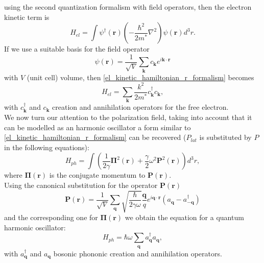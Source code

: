 \documentclass[12pt, a4paper]{report}
\numberwithin{equation}{section}
\begin{document}
using the second quantization formalism with field operators, then the electron kinetic term is
\begin{equation}
    H_{el}=\int\psi^\dagger(\mathbf{r})\left(-\frac{\hbar^2}{2m^*}\nabla^2\right)\psi(\mathbf{r})d^3r.
    \label{el_kinetic_hamiltonian_r_formalism}
\end{equation}
If we use a suitable basis for the field operator
\begin{equation}
    \psi(\mathbf{r})=\frac{1}{\sqrt{V}}\sum_\mathbf{k}c_\mathbf{k}e^{i\mathbf{k}\cdot\mathbf{r}}
    \label{from_r_to_k_electron_field_operator}
\end{equation}
with $V$ (unit cell) volume, then \ref{el_kinetic_hamiltonian_r_formalism} becomes
\begin{equation}
    H_{el}=\sum_\mathbf{k}\frac{k^2}{2m^*}c^\dagger_\mathbf{k}c_\mathbf{k},
    \label{el_kinetic_hamiltonian_k_formalism}
\end{equation}
with $c^\dagger_\mathbf{k}$ and $c_\mathbf{k}$ creation and annihilation operators for the free electron.\\
We now turn our attention to the polarization field, taking into account that it can be modelled as an harmonic oscillator a 
form similar to \ref{el_kinetic_hamiltonian_r_formalism} can be recovered ($P_{lat}$ is substituted by $P$ in the following equations):
\begin{equation}
    H_{ph}=\int\left(\frac{1}{2\gamma}\mathbf{\Pi}^2(\mathbf{r})+\frac{\gamma}{2}\omega^2\mathbf{P}^2(\mathbf{r})\right)d^3r,
\end{equation}
where $\mathbf{\Pi}(\mathbf{r})$ is the conjugate momentum to $\mathbf{P}(\mathbf{r})$.\\
Using the canonical substitution for the operator $\mathbf{P}(\mathbf{r})$ 
\begin{equation}
    \mathbf{P}(\mathbf{r})=\frac{1}{\sqrt{V}}\sum_{\mathbf{q}}\sqrt{\frac{\hbar}{2\gamma\omega}}\frac{\mathbf{q}}{q}e^{i\mathbf{q}\cdot\mathbf{r}}(a_\mathbf{q}-a_\mathbf{-q}^\dagger)
     \label{P_expansion_quantum}
\end{equation}
and the corresponding one for $\mathbf{\Pi}(\mathbf{r})$ we obtain the equation for a quantum harmonic oscillator:
\begin{equation}
    H_{ph}=\hbar\omega\sum_\mathbf{q} a^\dagger_\mathbf{q}a_\mathbf{q},
\end{equation}
with $a^\dagger_\mathbf{q}$ and $a_\mathbf{q}$ bosonic phononic creation and annihilation operators.\\ 
\end{document}
